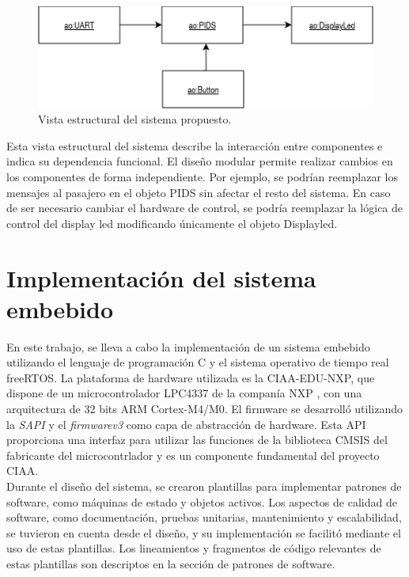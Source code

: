 \begin{figure}[ht]
	\centering
	\includegraphics[width=1\textwidth]{./Figures/diagVistaDisenho.png}
	\caption{Vista estructural del sistema propuesto.}
	\label{fig:diagVistaDisenho}
\end{figure}



Esta vista estructural del sistema describe la interacción entre componentes e indica su dependencia funcional. El diseño modular permite realizar cambios en los componentes de forma independiente. Por ejemplo, se podrían reemplazar los mensajes al pasajero en el objeto PIDS sin afectar el resto del sistema. En caso de ser necesario cambiar el hardware de control, se podría reemplazar la lógica de control del display led modificando únicamente el objeto Displayled.\\


\section{Implementación del sistema embebido}

En este trabajo, se lleva a cabo la implementación de un sistema embebido utilizando el lenguaje de programación C y el sistema operativo de tiempo real freeRTOS. La plataforma de hardware utilizada es la CIAA-EDU-NXP, que dispone de un microcontrolador LPC4337 de la companía NXP \citep{NXPLPC4337}, con una arquitectura de 32 bits ARM Cortex-M4/M0. El firmware se desarrolló utilizando la \textit{SAPI} y el \textit{firmwarev3} \citep{firmwarev3} como capa de abstracción de hardware. Esta API proporciona una interfaz para utilizar las funciones de la biblioteca CMSIS del fabricante del microcontrlador y es un componente fundamental del proyecto CIAA.\\
 
Durante el diseño del sistema, se crearon plantillas para implementar patrones de software, como máquinas de estado y objetos activos. Los aspectos de calidad de software, como documentación, pruebas unitarias, mantenimiento y escalabilidad,  se tuvieron en cuenta desde el diseño, y su implementación se facilitó mediante el uso de estas plantillas. Los lineamientos y fragmentos de código relevantes de estas plantillas son descriptos en la sección de patrones de software. \\

